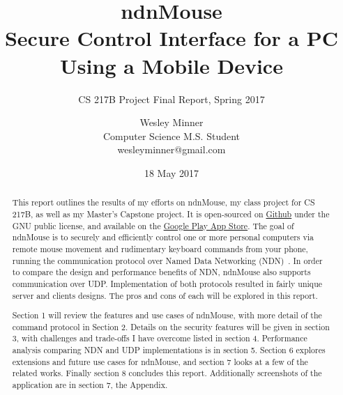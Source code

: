 \documentclass{sig-alternate}
\renewcommand\_{\textunderscore\allowbreak}  %
\begin{document}
	
\title{ndnMouse\\Secure Control Interface for a PC Using a Mobile Device}
\subtitle{CS 217B Project Final Report, Spring 2017}
\author{
	Wesley Minner\\
	Computer Science M.S. Student\\
	wesleyminner@gmail.com
}

\date{18 May 2017}
\maketitle

\begin{abstract}
This report outlines the results of my efforts on ndnMouse, my class project for CS 217B, as well as my Master's Capstone project. It is open-sourced on \href{https://github.com/wminner/ndnMouse}{Github} under the GNU public license, and available on the \href{https://play.google.com/store/apps/details?id=edu.ucla.cs.ndnmouse}{Google Play App Store}. The goal of ndnMouse is to securely and efficiently control one or more personal computers via remote mouse movement and rudimentary keyboard commands from your phone, running the communication protocol over Named Data Networking (NDN)~\cite{ndn}. In order to compare the design and performance benefits of NDN, ndnMouse also supports communication over UDP. Implementation of both protocols resulted in fairly unique server and clients designs. The pros and cons of each will be explored in this report.

Section 1 will review the features and use cases of ndnMouse, with more detail of the command protocol in Section 2. Details on the security features will be given in section 3, with challenges and trade-offs I have overcome listed in section 4. Performance analysis comparing NDN and UDP implementations is in section 5. Section 6 explores extensions and future use cases for ndnMouse, and section 7 looks at a few of the related works. Finally section 8 concludes this report. Additionally screenshots of the application are in section 7, the Appendix.
\end{abstract}


\end{document}
